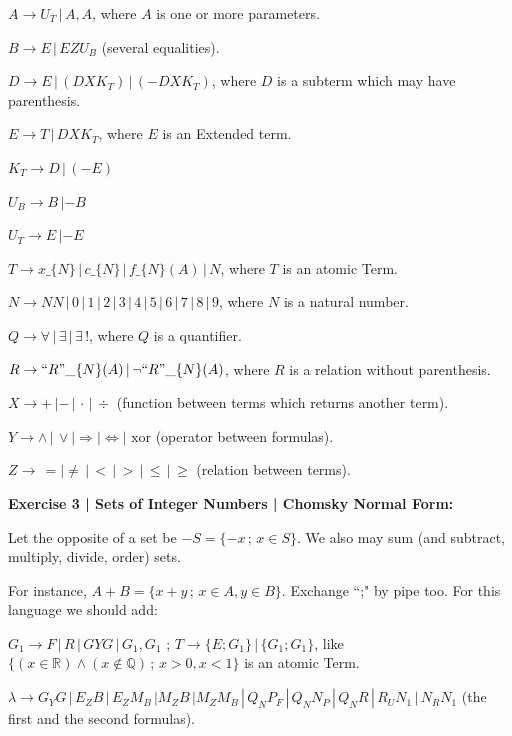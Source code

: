 \documentclass[11pt,a4paper]{article}
\begin{document}
		$A \rightarrow U_T\,|\, A, A$, where $A$ is one or more parameters.

		$B \rightarrow E\,|\,EZU_B$ (several equalities).

		$D \rightarrow E\,|\,(DXK_T)\,|\,(-DXK_T)$, where $D$ is a subterm which may have parenthesis.

		$E \rightarrow T\,|\, DXK_T$, where $E$ is an Extended term.

		$K_T \rightarrow D\,|\,(-E)$

		$U_B \rightarrow B\,|-B$

		$U_T \rightarrow E\,|-E$

		$T \rightarrow x\_\{N\} \,|\, c\_\{N\} \,|\, f\_\{N\}(A)\,|\,N$, where $T$ is an atomic Term.

		$N \rightarrow NN \,|\, 0\,|\,1\,|\,2\,|\,3\,|\,4\,|\,5\,|\,6\,|\,7\,|\,8\,|\,9$, where $N$ is a natural number.

		$Q \rightarrow \forall\,|\,\exists\,|\,\exists\,!$, where $Q$ is a quantifier.

		$R \rightarrow ``R"\_\{N\}(A) \,|\, \neg ``R"\_\{N\}(A)$, where $R$ is a relation without parenthesis.

		$X \rightarrow +\,|-\,|\,\cdot\,|\,\div$ (function between terms which returns another term).

		$Y \rightarrow \wedge\,|\,\vee|\Rightarrow|\Leftrightarrow|\text{ xor}$ (operator between formulas).

		$Z \rightarrow\, =|\ne\,|\,<\,|\,>\,|\,\le\,|\,\ge$ (relation between terms).

		\vspace{3mm}
		\Large
		\textbf{Exercise 3 | Sets of Integer Numbers | Chomsky Normal Form:}
		\small
		\vspace{3mm}

		Let the opposite of a set be $-S = \{ -x \,;\, x \in S \}$. We also may sum (and subtract, multiply, divide, order) sets.

		For instance, $A + B = \{ x + y \,;\, x \in A, y \in B \}$. Exchange ``;" by pipe too. For this language we should add:

		$G_1 \rightarrow F\,|\,R\,|\,GYG\,|\,G_1,G_1$ ; $T \rightarrow \{ E ; G_1 \} \, |\, \{ G_1 ; G_1 \}$, like $\{ (x \in \mathbb{R}) \wedge (x \notin \mathbb{Q}) \,;\, x > 0, x < 1 \}$ is an atomic Term.

		\vspace{3mm}

		$\lambda \rightarrow G_YG\,|\,E_ZB\,|\,E_ZM_B\,|M_ZB\,|M_ZM_B\,|\, Q_N P_F\,|\, Q_N N_P\,|\, Q_N R\,|\,R_UN_1 \,|\, N_RN_1$ (the first and the second formulas).
\end{document}
